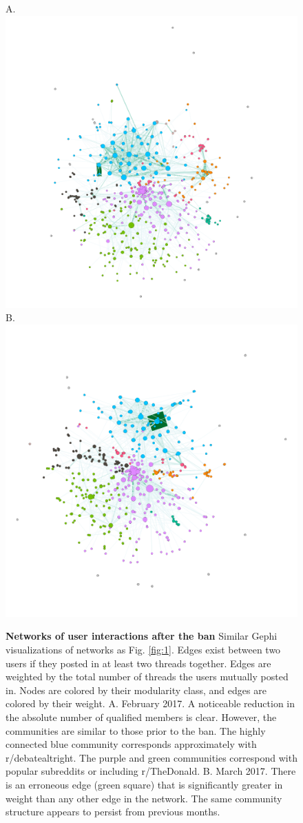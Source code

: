 \documentclass[twoside,twocolumn]{article}
\begin{document}
\begin{figure}
\centering
A.\includegraphics[width=0.6\linewidth]{feb2017net.png} 
B.\includegraphics[width=0.6\linewidth]{mar2017netbad.png}
\caption{\textbf{Networks of user interactions after the ban} Similar Gephi visualizations of networks as Fig. \ref{fig:1}. Edges exist between two users if they posted in at least two threads together. Edges are weighted by the total number of threads the users mutually posted in. Nodes are colored by their modularity class, and edges are colored by their weight. A. February 2017. A noticeable reduction in the absolute number of qualified members is clear. However, the communities are similar to those prior to the ban. The highly connected blue community corresponds approximately with r/debatealtright. The purple and green communities correspond with popular subreddits or including r/The\textunderscore Donald. B. March 2017. There is an erroneous edge (green square) that is significantly greater in weight than any other edge in the network. The same community structure appears to persist from previous months.}
\label{fig:2}
\end{figure}
\end{document}
